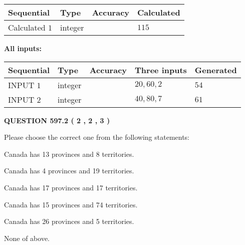 \documentclass[12pt]{article}
\begin{document}
   
   
   
\noindent{}
   
   
  
  
\noindent\begin{tabular}{|l|l|l|l|}
\hline
 Sequential & Type & Accuracy & Calculated \\ 
\hline
 
 
  Calculated $  1 $ & integer &  & 
  $ 115 $ 
 \\  \hline  
 \end{tabular}
   
   
   
   
\noindent\vspace{0.1in}\hspace{-0.08in} {\textbf{\Large{All inputs: }}}
   
   
  
  
\noindent\begin{tabular}{|l|l|l|l|l|}
\hline
 Sequential & Type & Accuracy & Three inputs & Generated \\ 
\hline
 
 
  INPUT $  1 $ & integer &  & $
 20
 , 
 60
 , 
 2
 $ & $ 54 $ 
 \\  \hline  
 
 
  INPUT $  2 $ & integer &  & $
 40
 , 
 80
 , 
 7
 $ & $ 61 $ 
 \\  \hline  
 \end{tabular}
   
   
  
\vspace{0.2in}
  
{\textbf{\Large{QUESTION
597.2 
 ( 2 , 2 , 3 )
}}}
  
  
Please choose the correct one from the following statements:
 
 
Canada has  13 provinces and  8 territories.
 
 
Canada has   4 provinces and  19 territories.
 
 
Canada has  17 provinces and  17 territories.
 
 
Canada has  15 provinces and  74 territories.
 
 
Canada has  26 provinces and  5 territories.
 
 
 None of above.
 
\end{document}
